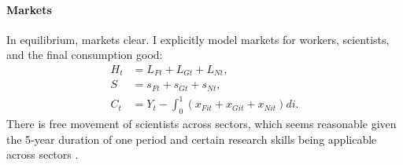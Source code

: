 






\paragraph{Markets}
In equilibrium, markets clear. I explicitly model markets for workers, scientists, and the final consumption good:
\begin{align*}
	H_{t}&=L_{Ft}+L_{Gt}+L_{Nt},\\
	S&=s_{Ft}+s_{Gt}+s_{Nt},\\
	C_t&=Y_t-\int_{0}^{1}\left(x_{Fit}+x_{Git}+x_{Nit}\right)di.  %
\end{align*}
There is free movement of scientists across sectors, which seems reasonable given the 5-year duration of one period and certain research skills being applicable across sectors \citep{Fried2018ClimateAnalysis}. 

